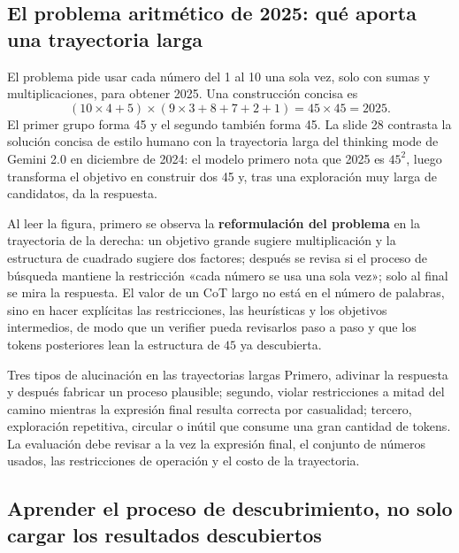 \subsection{El problema aritmético de 2025: qué aporta una trayectoria larga}

El problema pide usar cada número del 1 al 10 una sola vez, solo con sumas y multiplicaciones, para obtener 2025. Una construcción concisa es
\[
(10\times4+5)\times(9\times3+8+7+2+1)=45\times45=2025.
\]
El primer grupo forma 45 y el segundo también forma 45. La slide 28 contrasta la solución concisa de estilo humano con la trayectoria larga del thinking mode de Gemini 2.0 en diciembre de 2024: el modelo primero nota que 2025 es $45^2$, luego transforma el objetivo en construir dos 45 y, tras una exploración muy larga de candidatos, da la respuesta.


Al leer la figura, primero se observa la \textbf{reformulación del problema} en la trayectoria de la derecha: un objetivo grande sugiere multiplicación y la estructura de cuadrado sugiere dos factores; después se revisa si el proceso de búsqueda mantiene la restricción «cada número se usa una sola vez»; solo al final se mira la respuesta. El valor de un CoT largo no está en el número de palabras, sino en hacer explícitas las restricciones, las heurísticas y los objetivos intermedios, de modo que un verifier pueda revisarlos paso a paso y que los tokens posteriores lean la estructura de $45$ ya descubierta.

\begin{warningbox}{Tres tipos de alucinación en las trayectorias largas}
Primero, adivinar la respuesta y después fabricar un proceso plausible; segundo, violar restricciones a mitad del camino mientras la expresión final resulta correcta por casualidad; tercero, exploración repetitiva, circular o inútil que consume una gran cantidad de tokens. La evaluación debe revisar a la vez la expresión final, el conjunto de números usados, las restricciones de operación y el costo de la trayectoria.
\end{warningbox}

\subsection{Aprender el proceso de descubrimiento, no solo cargar los resultados descubiertos}


